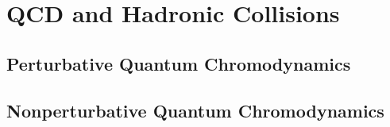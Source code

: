 \chapter{QCD and Hadronic Collisions}
\label{sec:QCD}

\section{Perturbative Quantum Chromodynamics}

\section{Nonperturbative Quantum Chromodynamics}
